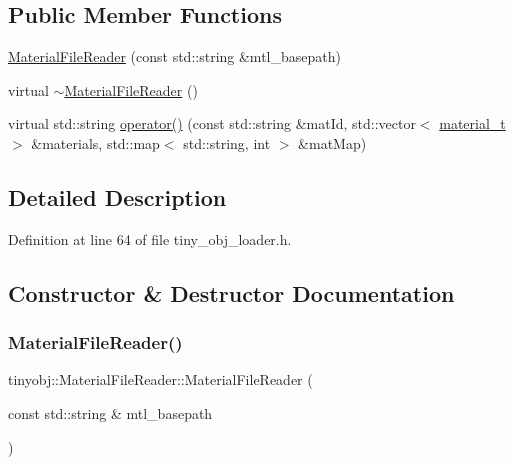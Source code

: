 \subsection*{Public Member Functions}
\begin{DoxyCompactItemize}
\item 
\hyperlink{classtinyobj_1_1_material_file_reader_a824d0100284310fe213d86ad443cc575}{Material\+File\+Reader} (const std\+::string \&mtl\+\_\+basepath)
\item 
virtual \hyperlink{classtinyobj_1_1_material_file_reader_a0a00d236393f9972b676a2fb6fe2b819}{$\sim$\+Material\+File\+Reader} ()
\item 
virtual std\+::string \hyperlink{classtinyobj_1_1_material_file_reader_a9374212c9997aa8ac0d15d97f67b25f8}{operator()} (const std\+::string \&mat\+Id, std\+::vector$<$ \hyperlink{structtinyobj_1_1material__t}{material\+\_\+t} $>$ \&materials, std\+::map$<$ std\+::string, int $>$ \&mat\+Map)
\end{DoxyCompactItemize}


\subsection{Detailed Description}


Definition at line 64 of file tiny\+\_\+obj\+\_\+loader.\+h.



\subsection{Constructor \& Destructor Documentation}
\mbox{\label{classtinyobj_1_1_material_file_reader_a824d0100284310fe213d86ad443cc575}} 
\subsubsection{\texorpdfstring{Material\+File\+Reader()}{MaterialFileReader()}}
{\footnotesize\ttfamily tinyobj\+::\+Material\+File\+Reader\+::\+Material\+File\+Reader (\begin{DoxyParamCaption}\item[{const std\+::string \&}]{mtl\+\_\+basepath }\end{DoxyParamCaption})\hspace{0.3cm}{\ttfamily [inline]}}



